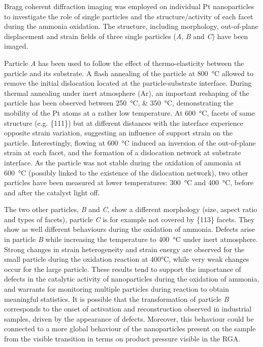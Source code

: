 Bragg coherent diffraction imaging was employed on individual Pt nanoparticles to investigate the role of single particles and the structure/activity of each facet during the ammonia oxidation.
The structure, including morphology, out-of-plane displacement and strain fields of three single particles (\textit{A}, \textit{B} and \textit{C}) have been imaged.

Particle \textit{A} has been used to follow the effect of thermo-elasticity between the particle and its substrate.
A flash annealing of the particle at \qty{800}{\degreeCelsius} allowed to remove the initial dislocation located at the particle-substrate interface.
During thermal annealing under inert atmosphere (Ar), an important reshaping of the particle has been observed between \qtylist{250;350}{\degreeCelsius}, demonstrating the mobility of the Pt atoms at a rather low temperature.
At \qty{600}{\degreeCelsius}, facets of same structure (e.g. \{111\}) but at different distances with the interface experience opposite strain variation, suggesting an influence of support strain on the particle.
Interestingly, flowing  at \qty{600}{\degreeCelsius} induced an inversion of the out-of-plane strain at each facet, and the formation of a dislocation network at substrate interface.
As the particle was not stable during the oxidation of ammonia at \qty{600}{\degreeCelsius} (possibly linked to the existence of the dislocation network), two other particles have been measured at lower temperatures: \qty{300}{\degreeCelsius} and \qty{400}{\degreeCelsius}, before and after the catalyst light off.

The two other particles, \textit{B} and \textit{C}, show a different morphology (size, aspect ratio and types of facets), particle \textit{C} is for example not covered by \{113\} facets.
They show as well different behaviours during the oxidation of ammonia.
Defects arise in particle \textit{B} while increasing the temperature to \qty{400}{\degreeCelsius} under inert atmosphere.
Strong changes in strain heterogeneity and strain energy are observed for the small particle during the oxidation reaction at 400°C, while very weak changes occur for the large particle.
These results tend to support the importance of defects in the catalytic activity of nanoparticles during the oxidation of ammonia, and warrants for monitoring multiple particles during reaction to obtain meaningful statistics.
It is possible that the transformation of particle \textit{B} corresponds to the onset of activation and reconstruction observed in industrial samples, driven by the appearance of defects.
Moreover, this behaviour could be connected to a more global behaviour of the nanoparticles present on the sample from the visible transition in terms on product pressure visible in the RGA.

